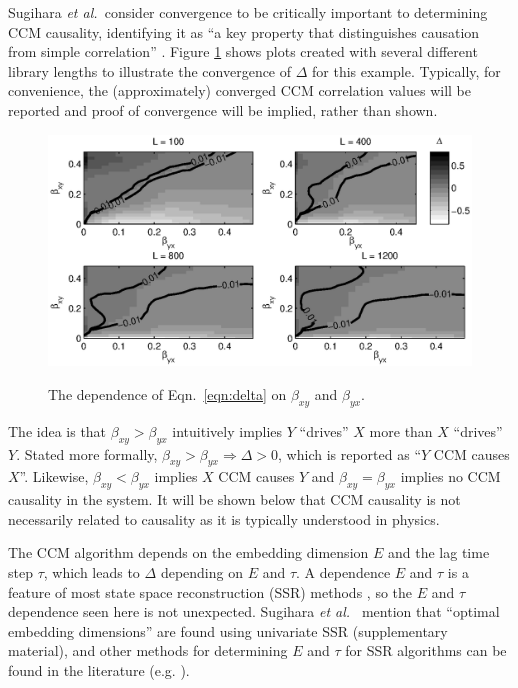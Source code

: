 \documentclass[twocolumn,aps,pre,groupedaddress]{revtex4-1}
\begin{document}
Sugihara {\em et al.\ }consider convergence to be critically important to determining CCM causality, identifying it as ``a key property that distinguishes causation from simple correlation'' \cite{Sugihara2012}.  Figure \ref{fig:BGridPlot} shows plots created with several different library lengths to illustrate the convergence of $\Delta$ for this example.  Typically, for convenience, the (approximately) converged CCM correlation values will be reported and proof of convergence will be implied, rather than shown.
\begin{figure}[ht]
\label{fig:BGridPlot}
\includegraphics[scale=0.55]{Figure1.eps}\\
\caption{The dependence of Eqn.\ \ref{eqn:delta} on $\beta_{xy}$ and $\beta_{yx}$.}
\end{figure}

The idea is that $\beta_{xy}>\beta_{yx}$ intuitively implies $Y$ ``drives'' $X$ more than $X$ ``drives'' $Y$.  Stated more formally, $\beta_{xy}>\beta_{yx}\Rightarrow\Delta>0$, which is reported as ``$Y$ CCM causes $X$''.  Likewise, $\beta_{xy}<\beta_{yx}$ implies $X$ CCM causes $Y$ and $\beta_{xy}=\beta_{yx}$ implies no CCM causality in the system.  It will be shown below that CCM causality is not necessarily related to causality as it is typically understood in physics.

The CCM algorithm depends on the embedding dimension $E$ and the lag time step $\tau$, which leads to $\Delta$ depending on $E$ and $\tau$.  A dependence $E$ and $\tau$ is a feature of most state space reconstruction (SSR) methods \cite{Hong2006,vlachos2009,Small2004}, so the $E$ and $\tau$ dependence seen here is not unexpected.  Sugihara {\em et al.\ } mention that ``optimal embedding dimensions'' are found using univariate SSR \cite{Sugihara2012} (supplementary material), and other methods for determining $E$ and $\tau$ for SSR algorithms can be found in the literature (e.g. \cite{Hong2006,Small2004,Kennel1992}).
\end{document}
